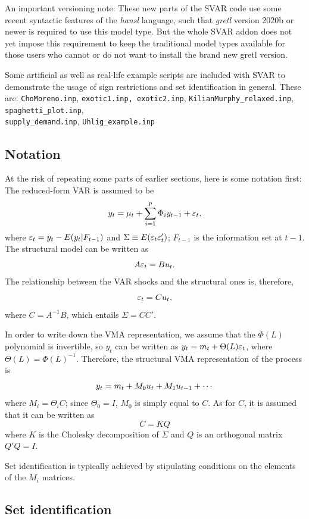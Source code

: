 \documentclass[a4paper,10pt]{article}
\newcounter{script}[section]
\newcommand{\PrE}[1]{\ensuremath \varepsilon_{#1}}
\newcommand{\StS}[1]{\ensuremath u_{#1}}
\begin{document}
An important versioning note: These new parts of the SVAR code use some recent 
syntactic features of the \textsl{hansl} language, such that \textsl{gretl} version 
2020b or newer is required to use this model type.
But the whole SVAR addon does not yet impose this requirement to keep the traditional
model types available for those users who cannot or do not want to install the brand
new gretl version.

Some artificial as well as real-life example scripts are included with SVAR to demonstrate
the usage of sign restrictions and set identification in general. These are: 
\texttt{ChoMoreno.inp}, \texttt{exotic1.inp, exotic2.inp}, \texttt{KilianMurphy\_relaxed.inp}, 
\texttt{spaghetti\_plot.inp}, \\
\texttt{supply\_demand.inp}, \texttt{Uhlig\_example.inp}

\subsection{Notation}

At the risk of repeating some parts of earlier sections, here is some notation first:
The reduced-form VAR is assumed to be
\[
  y_t  =  \mu_t + \sum_{i=1}^p \Phi_i y_{t-1} + \PrE{t}, 
\]
where $\PrE{t} = y_t - E(y_t |F_{t-1})$ and
$\Sigma \equiv E(\PrE{t} \PrE{t}')$; $F_{t-1}$ is the information set
at $t-1$. The structural model can be written as
\[
  A \PrE{t} = B \StS{t} .
\]
The relationship between the VAR shocks and the structural ones is,
therefore,
\[
\PrE{t} = C \StS{t} ,
\]
where $C = A^{-1} B$, which entails $\Sigma = CC'$.

In order to write down the VMA representation, we assume that the
$\Phi(L)$ polynomial is invertible, so $y_t$ can be written as
$ y_t = m_t + \Theta(L) \PrE{t}$, where $\Theta(L) =
\Phi(L)^{-1}$. Therefore, the structural VMA representation of the
process is
\[
y_t = m_t + M_0 \StS{t} + M_1 \StS{t-1} + \cdots
\]
where $M_i = \Theta_i C$; since $\Theta_0 = I$, $M_0$ is simply equal
to $C$. As for $C$, it is assumed that it can be written as
\begin{equation}
  \label{eq:rotation}
  C = K Q
\end{equation}
where $K$ is the Cholesky decomposition of $\Sigma$ and $Q$ is an
orthogonal matrix $Q'Q = I$.

Set identification is typically achieved by stipulating conditions on
the elements of the $M_i$ matrices.

\subsection{Set identification}
\end{document}
